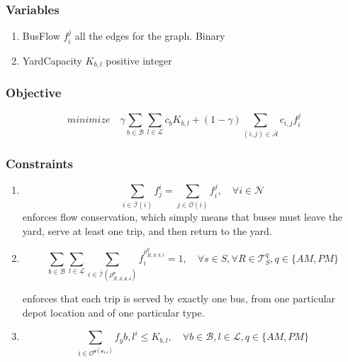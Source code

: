 \documentclass[11pt]{article}
\begin{document}
\subsubsection{Variables}
\label{sec:org38136f9}
\begin{enumerate}
\item BusFlow \(f_i^j\)  all the edges for the graph. Binary
\item YardCapacity \(K_{b,l}\) positive integer
\end{enumerate}
\subsubsection{Objective}
\label{sec:org07821ea}
$$ minimize   \quad \gamma \sum_{b \in \mathcal{B}} \sum_{l \in \mathcal{L}}c_b K_{b,l} + (1 - \gamma) \sum_{(i,j) \in \mathcal{\overline{A}}}c_{i,j}f_i^{j}$$ 
\subsubsection{Constraints}
\label{sec:orgff9d5a9}
\begin{enumerate}
\item $$\sum_{i \in \mathcal{\overline{I}}{(i)}}f_j^i  = \sum_{j \in \mathcal{\overline{O}}{(i)}}f_i^j,
      \quad  \forall i \in \mathcal{\overline{N}}$$
enforces flow conservation, which simply means that buses must leave the
 yard, serve at least one trip, and then return to the yard.

\item $$\sum_{b \in \mathcal{B}} \sum_{l \in \mathcal{L}} \sum_{i \in \mathcal{\overline{I} (\rho_{R,S,b,l}^{q})}} f_i^{\rho_{R,S,b,l}^{q}} = 1, \quad \forall s \in S, \forall R \in \mathcal{T}_S^{q}, q \in {\{AM, PM\}} $$

enforces that each trip is served by exactly one bus, from one particular
depot location and of one particular type.

\item $$\sum_{i \in \mathcal{O^{q(y_{b,l})}}} f_y{b,l}^i \leq K_{b,l}, \quad \forall b \in
     \mathcal{B}, l \in \mathcal{L}, q \in {\{AM, PM\}}$$
\end{enumerate}
\end{document}

